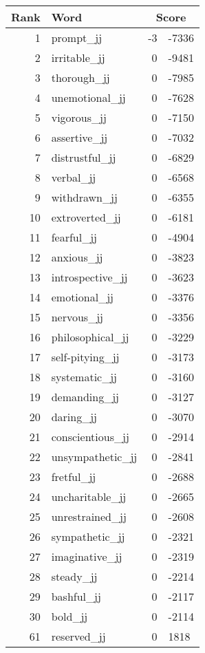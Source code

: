 \begin{longtable}[!htbp]{| rlr@{.}l |}
    \hline
    \textbf{Rank} & \textbf{Word} & \multicolumn{2}{c|}{\textbf{Score}} \\
    \hline
    \endhead
    1 & prompt\_jj & -3 & -7336 \\
    2 & irritable\_jj & 0 & -9481 \\
    3 & thorough\_jj & 0 & -7985 \\
    4 & unemotional\_jj & 0 & -7628 \\
    5 & vigorous\_jj & 0 & -7150 \\
    6 & assertive\_jj & 0 & -7032 \\
    7 & distrustful\_jj & 0 & -6829 \\
    8 & verbal\_jj & 0 & -6568 \\
    9 & withdrawn\_jj & 0 & -6355 \\
    10 & extroverted\_jj & 0 & -6181 \\
    11 & fearful\_jj & 0 & -4904 \\
    12 & anxious\_jj & 0 & -3823 \\
    13 & introspective\_jj & 0 & -3623 \\
    14 & emotional\_jj & 0 & -3376 \\
    15 & nervous\_jj & 0 & -3356 \\
    16 & philosophical\_jj & 0 & -3229 \\
    17 & self-pitying\_jj & 0 & -3173 \\
    18 & systematic\_jj & 0 & -3160 \\
    19 & demanding\_jj & 0 & -3127 \\
    20 & daring\_jj & 0 & -3070 \\
    21 & conscientious\_jj & 0 & -2914 \\
    22 & unsympathetic\_jj & 0 & -2841 \\
    23 & fretful\_jj & 0 & -2688 \\
    24 & uncharitable\_jj & 0 & -2665 \\
    25 & unrestrained\_jj & 0 & -2608 \\
    26 & sympathetic\_jj & 0 & -2321 \\
    27 & imaginative\_jj & 0 & -2319 \\
    28 & steady\_jj & 0 & -2214 \\
    29 & bashful\_jj & 0 & -2117 \\
    30 & bold\_jj & 0 & -2114 \\
    61 & reserved\_jj & 0 & 1818 \\

\end{longtable}
